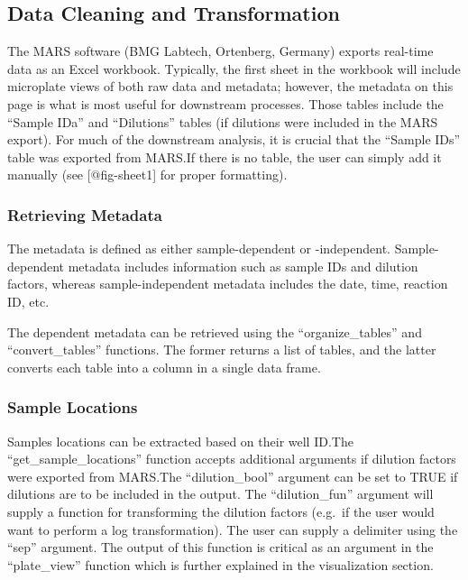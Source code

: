 \documentclass[preprint,12pt, a4paper]{elsarticle}
\begin{document}

    \subsection{Data Cleaning and Transformation}
        The MARS software (BMG Labtech, Ortenberg, Germany) exports real-time data as an Excel workbook. Typically, the first sheet in the workbook will include microplate views of both raw data and metadata; however, the metadata on this page is what is most useful for downstream processes. Those tables include the ``Sample IDa'' and ``Dilutions'' tables (if dilutions were included in the MARS export). For much of the downstream analysis, it is crucial that the ``Sample IDs'' table was exported from MARS.\@ If there is no table, the user can simply add it manually (see [@fig-sheet1] for proper formatting).

        \subsubsection{Retrieving Metadata}
            The metadata is defined as either sample-dependent or -independent. Sample-dependent metadata includes information such as sample IDs and dilution factors, whereas sample-independent metadata includes the date, time, reaction ID, etc.

            The dependent metadata can be retrieved using the ``organize\_tables'' and ``convert\_tables'' functions. The former returns a list of tables, and the latter converts each table into a column in a single data frame.

        \subsubsection{Sample Locations}
            Samples locations can be extracted based on their well ID.\@ The ``get\_sample\_locations'' function accepts additional arguments if dilution factors were exported from MARS.\@ The ``dilution\_bool'' argument can be set to TRUE if dilutions are to be included in the output. The ``dilution\_fun'' argument will supply a function for transforming the dilution factors (e.g.\ if the user would want to perform a log transformation). The user can supply a delimiter using the ``sep'' argument. The output of this function is critical as an argument in the ``plate\_view'' function which is further explained in the visualization section.
\end{document}
